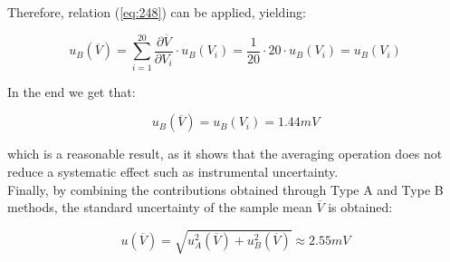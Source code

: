 \documentclass[../main.tex]{subfiles}
\begin{document}
Therefore, relation (\ref{eq:248}) can be applied, yielding:

\begin{equation}
	u_B(\overline{V}) = \sum_{i=1}^{20} \frac{\partial \overline{V}}{\partial V_i} \cdot u_B(V_i) = \frac{1}{20} \cdot 20 \cdot u_B(V_i) = u_B(V_i)
\end{equation}

In the end we get that:

\begin{equation}
	u_B(\overline{V}) = u_B(V_i) = 1.44 \unit{mV}
\end{equation}

which is a reasonable result, as it shows that the averaging operation does not reduce a systematic effect such as instrumental uncertainty.\\

Finally, by combining the contributions obtained through Type A and Type B methods, the standard uncertainty of the sample mean $\overline{V}$ is obtained:

\begin{equation}
	u(\overline{V}) = \sqrt{u^2_A(\overline{V}) + u^2_B(\overline{V})}  \approx 2.55 \unit{mV}
\end{equation}
\end{document}
